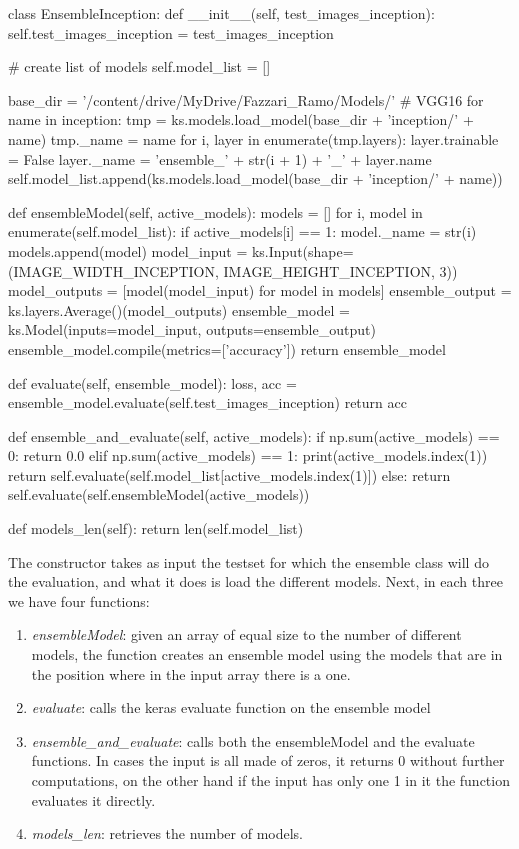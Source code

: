 \begin{python}
class EnsembleInception:
    def __init__(self, test_images_inception):
        self.test_images_inception = test_images_inception

        # create list of models
        self.model_list = []

        base_dir = '/content/drive/MyDrive/Fazzari_Ramo/Models/'
        # VGG16
        for name in inception:
            tmp = ks.models.load_model(base_dir + 'inception/' + name)
            tmp._name = name
            for i, layer in enumerate(tmp.layers):
                layer.trainable = False
                layer._name = 'ensemble_' + str(i + 1) + '_' + layer.name
            self.model_list.append(ks.models.load_model(base_dir + 'inception/' + name))


    def ensembleModel(self, active_models):
        models = []
        for i, model in enumerate(self.model_list):
            if active_models[i] == 1:
                model._name = str(i)
                models.append(model)
        model_input = ks.Input(shape=(IMAGE_WIDTH_INCEPTION, IMAGE_HEIGHT_INCEPTION, 3))
        model_outputs = [model(model_input) for model in models]
        ensemble_output = ks.layers.Average()(model_outputs)
        ensemble_model = ks.Model(inputs=model_input, outputs=ensemble_output)
        ensemble_model.compile(metrics=['accuracy'])
        return ensemble_model

    def evaluate(self, ensemble_model):
        loss, acc = ensemble_model.evaluate(self.test_images_inception)
        return acc

    def ensemble_and_evaluate(self, active_models):
        if np.sum(active_models) == 0:
            return 0.0
        elif np.sum(active_models) == 1:
            print(active_models.index(1))
            return self.evaluate(self.model_list[active_models.index(1)])
        else:
            return self.evaluate(self.ensembleModel(active_models))

    def models_len(self):
        return len(self.model_list)
\end{python}

The constructor takes as input the testset for which the ensemble class will do the evaluation, and what it does is load the different models. Next, in each three we have four functions:

\begin{enumerate}
	\item \textit{ensembleModel}: given an array of equal size to the number of different models, the function creates an ensemble model using the models that are in the position where in the input array there is a one.
	\item \textit{evaluate}: calls the keras evaluate function on the ensemble model
	\item \textit{ensemble\_and\_evaluate}: calls both the ensembleModel and the evaluate functions. In cases the input is all made of zeros, it returns 0 without further computations, on the other hand if the input has only one 1 in it the function evaluates it directly.
	\item \textit{models\_len}: retrieves the number of models.
\end{enumerate}

